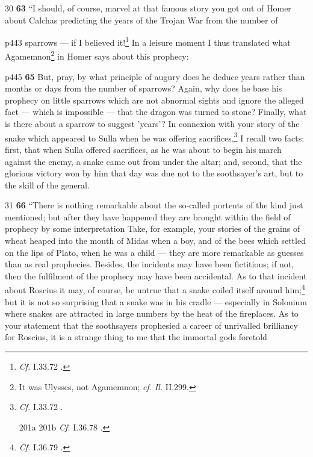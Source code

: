 30
\textbf{63} ``I should, of course, marvel at that famous story you got out of Homer about Calchas predicting the years of the Trojan War from the number of

p443 sparrows \texthebrew{—} if I believed it!\texthebrew{}\footnote{\emph{Cf.}
I.33.72 .

} In a leisure moment I thus translated what Agamemnon\texthebrew{}\footnote{It was Ulysses, not Agamemnon; \emph{cf.} \emph{Il.} II.299.

} in Homer says about this prophecy:

p445
\textbf{65} But, pray, by what principle of augury does he deduce years rather than months or days from the number of sparrows? Again, why does he base his prophecy on little sparrows which are not abnormal sights and ignore the alleged fact \texthebrew{—} which is impossible \texthebrew{—} that the dragon was turned to stone? Finally, what is there about a sparrow to suggest 'years'? In connexion with your story of the snake which appeared to Sulla when he was offering sacrifices,\texthebrew{}\footnote{\emph{Cf.}
I.33.72 .



201a
201b
\emph{Cf.}
I.36.78 .

} I recall two facts: first, that when Sulla offered sacrifices, as he was about to begin his march against the enemy, a snake came out from under the altar; and, second, that the glorious victory won by him that day was due not to the soothsayer's art, but to the skill of the general.

31
\textbf{66} ``There is nothing remarkable about the so\texthebrew{‑}called portents of the kind just mentioned; but after they have happened they are brought within the field of prophecy by some interpretation Take, for example, your stories of the grains of wheat heaped into the mouth of Midas when a boy,\texthebrew{} and of the bees which settled on the lips of Plato,\texthebrew{} when he was a child \texthebrew{—} they are more remarkable as guesses than as real prophecies. Besides, the incidents may have been fictitious; if not, then the fulfilment of the prophecy may have been accidental. As to that incident about Roscius it may, of course, be untrue that a snake coiled itself around him;\texthebrew{}\footnote{\emph{Cf.}
I.36.79 .

} but it is not so surprising that a snake was in his cradle \texthebrew{—} especially in Solonium where snakes are attracted in large numbers by the heat of the fireplaces. As to your statement that the soothsayers prophesied a career of unrivalled brilliancy for Roscius, it is a strange thing to me that the immortal gods foretold

